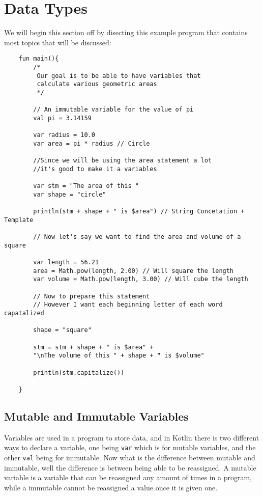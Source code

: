\chapter{Data Types}
We will begin this section off by disecting this example program that contains most topics that will be discussed: 
\begin{verbatim}
    fun main(){
        /*
         Our goal is to be able to have variables that 
         calculate various geometric areas
         */ 
    
        // An immutable variable for the value of pi
        val pi = 3.14159
    
        var radius = 10.0
        var area = pi * radius // Circle 
    
        //Since we will be using the area statement a lot
        //it's good to make it a variables 
    
        var stm = "The area of this "
        var shape = "circle"
    
        println(stm + shape + " is $area") // String Concetation + Template 
    
        // Now let's say we want to find the area and volume of a square 

        var length = 56.21
        area = Math.pow(length, 2.00) // Will square the length
        var volume = Math.pow(length, 3.00) // Will cube the length
    
        // Now to prepare this statement 
        // However I want each beginning letter of each word capatalized 
    
        shape = "square"

        stm = stm + shape + " is $area" + 
        "\nThe volume of this " + shape + " is $volume"

        println(stm.capitalize())
    
    }  
\end{verbatim}

\section{Mutable and Immutable Variables}
\par Variables are used in a program to store data, and in Kotlin there is two different ways to declare a variable, 
one being \verb!var! which is for mutable variables, and the other \verb!val! being for immutable. Now what is the difference between 
mutable and immutable, well the difference is between being able to be reassigned. A mutable variable is a variable that can be 
reassigned any amount of times in a program, while a immutable cannot be reassigned a value once it is given one.  

